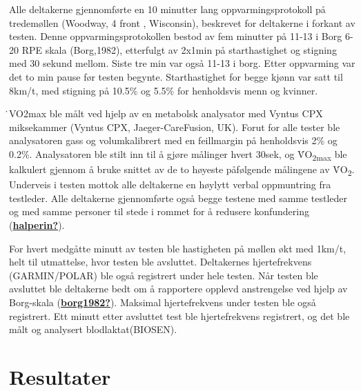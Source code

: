 \documentclass[
]{book}
\begin{document}
Alle deltakerne gjennomførte en 10 minutter lang oppvarmingsprotokoll på
tredemøllen (Woodway, 4 front , Wisconsin), beskrevet for deltakerne i
forkant av testen. Denne oppvarmingsprotokollen bestod av fem minutter
på 11-13 i Borg 6-20 RPE skala (Borg,1982), etterfulgt av 2x1min på
starthastighet og stigning med 30 sekund mellom. Siste tre min var også
11-13 i borg. Etter oppvarming var det to min pause før testen begynte.
Starthastighet for begge kjønn var satt til 8km/t, med stigning på
10.5\% og 5.5\% for henholdsvis menn og kvinner.

̇VO2max ble målt ved hjelp av en metabolsk analysator med Vyntus CPX
miksekammer (Vyntus CPX, Jaeger-CareFusion, UK). Forut for alle tester
ble analysatoren gass og volumkalibrert med en feillmargin på
henholdsvis 2\% og 0.2\%. Analysatoren ble stilt inn til å gjøre
målinger hvert 30sek, og V̇O\textsubscript{2max} ble kalkulert gjennom å
bruke snittet av de to høyeste påfølgende målingene av
V̇O\textsubscript{2}. Underveis i testen mottok alle deltakerne en
høylytt verbal oppmuntring fra testleder. Alle deltakerne gjennomførte
også begge testene med samme testleder og med samme personer til stede i
rommet for å redusere konfundering
(\protect\hyperlink{ref-halperin}{\textbf{halperin?}}).

For hvert medgåtte minutt av testen ble hastigheten på møllen økt med
1km/t, helt til utmattelse, hvor testen ble avsluttet. Deltakernes
hjertefrekvens (GARMIN/POLAR) ble også registrert under hele testen. Når
testen ble avsluttet ble deltakerne bedt om å rapportere opplevd
anstrengelse ved hjelp av Borg-skala
(\protect\hyperlink{ref-borg1982}{\textbf{borg1982?}}). Maksimal
hjertefrekvens under testen ble også registrert. Ett minutt etter
avsluttet test ble hjertefrekvens registrert, og det ble målt og
analysert blodlaktat(BIOSEN).

\hypertarget{resultater}{%
\section{Resultater}\label{resultater}}

\providecommand{\docline}[3]{\noalign{\global\setlength{\arrayrulewidth}{#1}}\arrayrulecolor[HTML]{#2}\cline{#3}}

\setlength{\tabcolsep}{2pt}

\renewcommand*{\arraystretch}{1.5}
\end{document}
